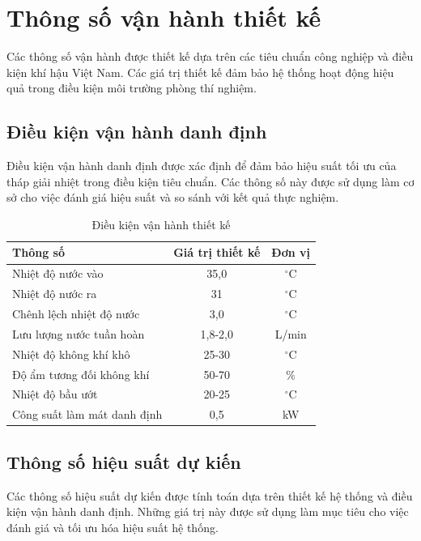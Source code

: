 \documentclass[../main.tex]{subfiles}
\begin{document}
\section{Thông số vận hành thiết kế}
\label{sec:operating_parameters}

Các thông số vận hành được thiết kế dựa trên các tiêu chuẩn công nghiệp và điều kiện khí hậu Việt Nam. Các giá trị thiết kế đảm bảo hệ thống hoạt động hiệu quả trong điều kiện môi trường phòng thí nghiệm.

\subsection{Điều kiện vận hành danh định}
\label{sec:design_conditions}

Điều kiện vận hành danh định được xác định để đảm bảo hiệu suất tối ưu của tháp giải nhiệt trong điều kiện tiêu chuẩn. Các thông số này được sử dụng làm cơ sở cho việc đánh giá hiệu suất và so sánh với kết quả thực nghiệm.

\begin{table}[H]
\centering
\renewcommand{\arraystretch}{1.1}
\caption{Điều kiện vận hành thiết kế}
\label{tab:design_conditions}
\begin{tabular}{|l|c|c|}
\hline
\textbf{Thông số} & \textbf{Giá trị thiết kế} & \textbf{Đơn vị} \\
\hline
Nhiệt độ nước vào & 35,0 & $^\circ\mathrm{C}$ \\
\hline
Nhiệt độ nước ra & 31 & $^\circ\mathrm{C}$ \\
\hline
Chênh lệch nhiệt độ nước & 3,0 & $^\circ\mathrm{C}$ \\
\hline
Lưu lượng nước tuần hoàn & 1,8-2,0 & L/min \\
\hline
Nhiệt độ không khí khô & 25-30 & $^\circ\mathrm{C}$ \\
\hline
Độ ẩm tương đối không khí & 50-70 & \% \\
\hline
Nhiệt độ bầu ướt & 20-25 & $^\circ\mathrm{C}$ \\
\hline
Công suất làm mát danh định & 0,5 & kW \\
\hline
\end{tabular}
\end{table}

\subsection{Thông số hiệu suất dự kiến}
\label{sec:performance_parameters}

Các thông số hiệu suất dự kiến được tính toán dựa trên thiết kế hệ thống và điều kiện vận hành danh định. Những giá trị này được sử dụng làm mục tiêu cho việc đánh giá và tối ưu hóa hiệu suất hệ thống.
\end{document}
